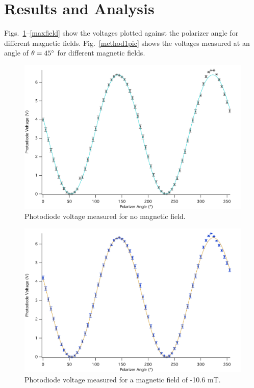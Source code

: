 \documentclass[prb,preprint]{revtex4-1}
\begin{document}
\section{Results and Analysis}
{Figs.~\ref{nofield}--\ref{maxfield} show the voltages plotted against the polarizer angle for different magnetic fields. Fig.~\ref{method1pic} shows the voltages measured at an angle of $\theta=45\degree$ for different magnetic fields. 
\begin{figure}[h]
\includegraphics[width = 5.8in]{0A.pdf}
\caption{\label{nofield}Photodiode voltage measured for no magnetic field.}
\end{figure}

\begin{figure}
\includegraphics[width = 5.8in]{n1A.pdf}
\caption{\label{neg}Photodiode voltage measured for a magnetic field of -10.6 mT.}
\end{figure}

}
\end{document}
